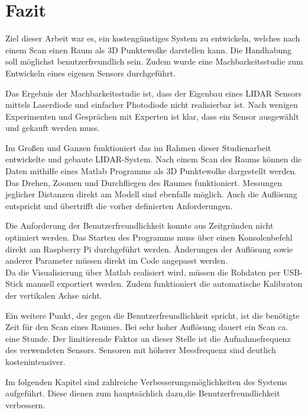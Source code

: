 \chapter{Fazit}\label{chap:fazit}

Ziel dieser Arbeit war es, ein kostengünstiges System zu entwickeln, welches nach einem Scan einen Raum als 3D Punktewolke darstellen kann. Die Handhabung soll möglichst benutzerfreundlich sein. Zudem wurde eine Machbarkeitsstudie zum Entwickeln eines eigenen Sensors durchgeführt.

Das Ergebnis der Machbarkeitsstudie ist, dass der Eigenbau eines \ac{LIDAR} Sensors mittels Laserdiode und einfacher Photodiode nicht realisierbar ist. Nach wenigen Experimenten und Gesprächen mit Experten ist klar, dass ein Sensor ausgewählt und gekauft werden muss.

Im Großen und Ganzen funktioniert das im Rahmen dieser Studienarbeit entwickelte und gebaute \ac{LIDAR}-System. Nach einem Scan des Raums können die Daten mithilfe eines Matlab Programms als 3D Punktewolke dargestellt werden. Das Drehen, Zoomen und Durchfliegen des Raumes funktioniert. Messungen jeglicher Distanzen direkt am Modell sind ebenfalls möglich. Auch die Auflösung entspricht und übertrifft die vorher definierten Anforderungen.


Die Anforderung der Benutzerfreundlichkeit konnte aus Zeitgründen nicht optimiert werden. Das Starten des Programms muss über einen Konsolenbefehl direkt am Raspberry Pi durchgeführt werden. Änderungen der Auflösung sowie anderer Parameter müssen direkt im Code angepasst werden.\\
Da die Visualisierung über Matlab realisiert wird, müssen die Rohdaten per USB-Stick manuell exportiert werden. Zudem funktioniert die automatische Kalibraton der vertikalen Achse nicht.

Ein weitere Punkt, der gegen die Benutzerfreundlichkeit spricht, ist die benötigte Zeit für den Scan eines Raumes. Bei sehr hoher Auflösung dauert ein Scan ca. eine Stunde. Der limitierende Faktor an dieser Stelle ist die Aufnahmefrequenz des verwendeten Sensors. Sensoren mit höherer Messfrequenz sind deutlich kostenintensiver.

Im folgenden Kapitel sind zahlreiche Verbesserungsmöglichkeiten des Systems aufgeführt. Diese dienen zum hauptsächlich dazu,die Benutzerfreundlichkeit verbessern.


